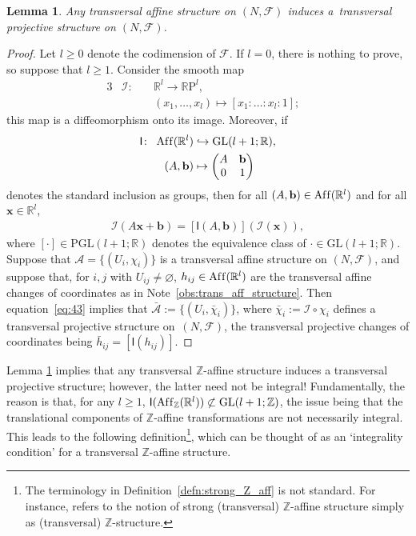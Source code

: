 \documentclass[10pt,a4paper]{amsart}
\numberwithin{equation}{section}
\newtheorem{Lemma}[Theorem]{Lemma}
\newcommand{\RR}{\mathbb{R}}
\newcommand{\ZZ}{\mathbb{Z}}
\begin{document}
\begin{Lemma}\label{lemma:affine_as_proj}
Any transversal affine structure on $(N,\mathcal{F})$ induces a~transversal projective structure on $(N,\mathcal{F})$.
\end{Lemma}
\begin{proof}
Let $l \geq 0$ denote the codimension of $\mathcal{F}$. If $l =0$, there is nothing to prove, so suppose that $l \geq 1$. Consider the smooth map
 \begin{alignat*}{3}
 & \mathcal{I} \colon \ && \RR^l \to \RR\mathrm{P}^l, & \\
 &&& \left(x_1,\ldots,x_l\right) \mapsto [x_1:\ldots:x_l :1];&
 \end{alignat*}
this map is a dif\/feomorphism onto its image. Moreover, if
 \begin{gather} \label{eq:41}
 \begin{split}
 \mathsf{I} \colon \ \operatorname{Af\/f}(\RR^l) &\hookrightarrow \mathrm{GL}(l+1;\RR), \\
 (A,\mathbf{b}) &\mapsto
 \begin{pmatrix}
 A & \mathbf{b} \\
 0 & 1
 \end{pmatrix}
 \end{split}
 \end{gather}
denotes the standard inclusion as groups, then for all $(A,\mathbf{b}) \in \operatorname{Af\/f}(\RR^l)$ and for
 all $\mathbf{x} \in \RR^l$,
 \begin{gather} \label{eq:43}
 \mathcal{I} (A \mathbf{x} + \mathbf{b} ) = [\mathsf{I}(A,\mathbf{b})](\mathcal{I}(\mathbf{x})),
 \end{gather}
where $[\cdot] \in \mathrm{PGL}(l+1;\RR)$ denotes the equivalence class of $\cdot \in \mathrm{GL}(l+1;\RR)$. Suppose that $\mathcal{A}=\{(U_i, \chi_i)\}$ is a transversal af\/f\/ine structure on $(N,\mathcal{F})$, and suppose that, for $i,j$ with $U_{ij} \neq \varnothing$, $h_{ij} \in \operatorname{Af\/f}(\RR^l)$ are the transversal af\/f\/ine changes of coordinates as in Note~\ref{obs:trans_aff_structure}. Then equation~\eqref{eq:43} implies that $\bar{\mathcal{A}}:=\{(U_i,\bar{\chi}_i)\}$, where $\bar{\chi}_i := \mathcal{I} \circ \chi_i$ def\/ines a transversal projective structure on~$(N,\mathcal{F})$, the transversal projective changes of coordinates being $\bar{h}_{ij}=[\mathsf{I}(h_{ij})]$.
\end{proof}

Lemma \ref{lemma:affine_as_proj} implies that any transversal $\ZZ$-af\/f\/ine structure induces a transversal projective structure; however, the latter need not be integral! Fundamentally, the reason is that, for any $l \geq 1$, $\mathsf{I}(\operatorname{Af\/f}_{\ZZ}(\RR^l))\not\subset \mathrm{GL}(l+1;\ZZ)$, the issue being that the translational components of $\ZZ$-af\/f\/ine transformations are not necessarily integral. This leads to the following def\/inition\footnote{The terminology in Def\/inition~\ref{defn:strong_Z_aff} is not standard. For instance, \cite{gross_siebert} refers to the notion of strong (transversal) $\ZZ$-af\/f\/ine structure simply as (transversal) $\ZZ$-structure.}, which can be thought of as an `integrality condition' for a transversal $\ZZ$-af\/f\/ine structure.
\end{document}
